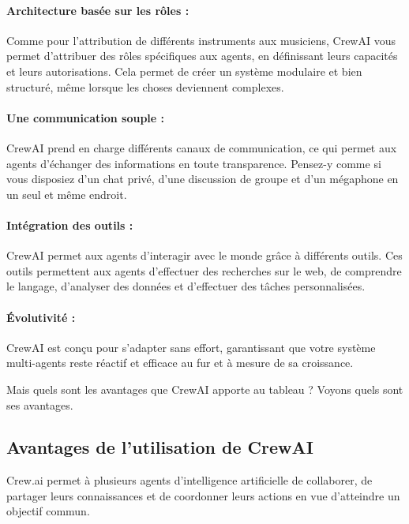 \paragraph{\textbf{Architecture basée sur les rôles :}} Comme pour l'attribution de différents instruments aux musiciens, CrewAI vous permet d'attribuer des rôles spécifiques aux agents, en définissant leurs capacités et leurs autorisations. Cela permet de créer un système modulaire et bien structuré, même lorsque les choses deviennent complexes.

\paragraph{\textbf{Une communication souple :}} CrewAI prend en charge différents canaux de communication, ce qui permet aux agents d'échanger des informations en toute transparence. Pensez-y comme si vous disposiez d'un chat privé, d'une discussion de groupe et d'un mégaphone en un seul et même endroit.

\paragraph{\textbf{Intégration des outils :}} CrewAI permet aux agents d'interagir avec le monde grâce à différents outils. Ces outils permettent aux agents d'effectuer des recherches sur le web, de comprendre le langage, d'analyser des données et d'effectuer des tâches personnalisées.

\paragraph{\textbf{Évolutivité :}} CrewAI est conçu pour s'adapter sans effort, garantissant que votre système multi-agents reste réactif et efficace au fur et à mesure de sa croissance.

\medskip

\noindent
Mais quels sont les avantages que CrewAI apporte au tableau ? Voyons quels sont ses avantages.

\subsection*{Avantages de l'utilisation de CrewAI}

\noindent
Crew.ai permet à plusieurs agents d'intelligence artificielle de collaborer, de partager leurs connaissances et de coordonner leurs actions en vue d'atteindre un objectif commun.

